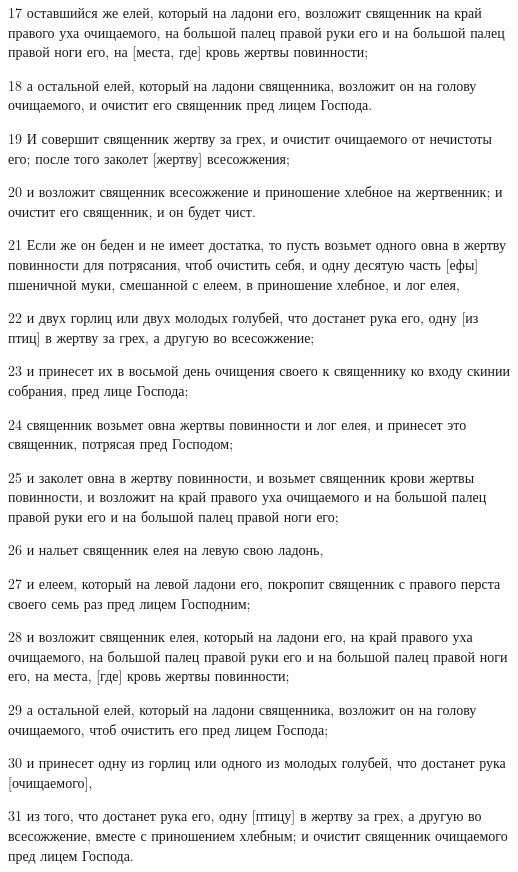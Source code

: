 \par 17 оставшийся же елей, который на ладони его, возложит священник на край правого уха очищаемого, на большой палец правой руки его и на большой палец правой ноги его, на [места, где] кровь жертвы повинности;
\par 18 а остальной елей, который на ладони священника, возложит он на голову очищаемого, и очистит его священник пред лицем Господа.
\par 19 И совершит священник жертву за грех, и очистит очищаемого от нечистоты его; после того заколет [жертву] всесожжения;
\par 20 и возложит священник всесожжение и приношение хлебное на жертвенник; и очистит его священник, и он будет чист.
\par 21 Если же он беден и не имеет достатка, то пусть возьмет одного овна в жертву повинности для потрясания, чтоб очистить себя, и одну десятую часть [ефы] пшеничной муки, смешанной с елеем, в приношение хлебное, и лог елея,
\par 22 и двух горлиц или двух молодых голубей, что достанет рука его, одну [из птиц] в жертву за грех, а другую во всесожжение;
\par 23 и принесет их в восьмой день очищения своего к священнику ко входу скинии собрания, пред лице Господа;
\par 24 священник возьмет овна жертвы повинности и лог елея, и принесет это священник, потрясая пред Господом;
\par 25 и заколет овна в жертву повинности, и возьмет священник крови жертвы повинности, и возложит на край правого уха очищаемого и на большой палец правой руки его и на большой палец правой ноги его;
\par 26 и нальет священник елея на левую свою ладонь,
\par 27 и елеем, который на левой ладони его, покропит священник с правого перста своего семь раз пред лицем Господним;
\par 28 и возложит священник елея, который на ладони его, на край правого уха очищаемого, на большой палец правой руки его и на большой палец правой ноги его, на места, [где] кровь жертвы повинности;
\par 29 а остальной елей, который на ладони священника, возложит он на голову очищаемого, чтоб очистить его пред лицем Господа;
\par 30 и принесет одну из горлиц или одного из молодых голубей, что достанет рука [очищаемого],
\par 31 из того, что достанет рука его, одну [птицу] в жертву за грех, а другую во всесожжение, вместе с приношением хлебным; и очистит священник очищаемого пред лицем Господа.
